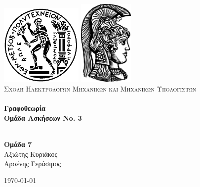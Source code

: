 \begin{titlepage}
\begin{center}

\includegraphics[width=0.3\textwidth]{../logos/pyrforos.png}
\includegraphics[width=0.2\textwidth]{../logos/uoa.png}\\[1cm]

\textsc{\LARGE Σχολή Ηλεκτρολόγων Μηχανικών και Μηχανικών Υπολογιστών}\\[1.5cm]

\HRule \\[0.4cm]
{\huge \bfseries Γραφοθεωρία\\
\LARGE Ομάδα Ασκήσεων No. 3}\\[0.4cm]

\HRule \\[1.5cm]

\begin{center}
\textbf{Ομάδα 7}\\
Αξιώτης Κυριάκος\\
Αρσένης Γεράσιμος
\end{center}

\vfill

{\large \today}
\end{center}

\end{titlepage}
